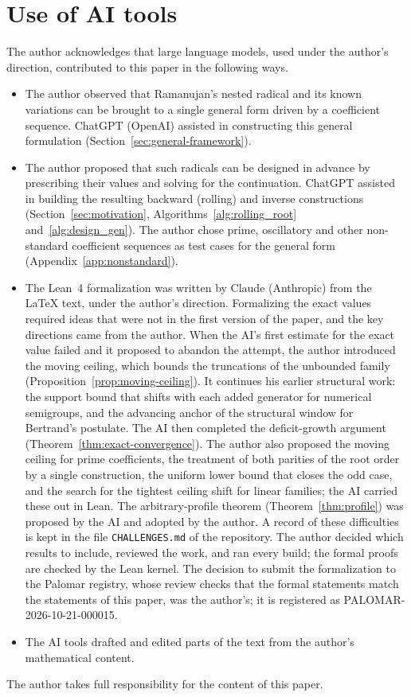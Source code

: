 \documentclass[11pt,a4paper]{amsart}
\theoremstyle{plain}
\theoremstyle{definition}
\theoremstyle{remark}
\begin{document}
\section*{Use of AI tools}
The author acknowledges that large language models, used under the author's
direction, contributed to this paper in the following ways.
\begin{itemize}
\item The author observed that Ramanujan's nested radical and its known variations
  can be brought to a single general form driven by a coefficient sequence. ChatGPT
  (OpenAI) assisted in constructing this general formulation
  (Section~\ref{sec:general-framework}).
\item The author proposed that such radicals can be designed in advance by
  prescribing their values and solving for the continuation. ChatGPT assisted in
  building the resulting backward (rolling) and inverse constructions
  (Section~\ref{sec:motivation}, Algorithms~\ref{alg:rolling_root}
  and~\ref{alg:design_gen}). The author chose prime, oscillatory and other
  non-standard coefficient sequences as test cases for the general form
  (Appendix~\ref{app:nonstandard}).
\item The Lean~4 formalization was written by Claude (Anthropic) from the
  \LaTeX{} text, under the author's direction. Formalizing the exact values
  required ideas that were not in the first version of the paper, and the key
  directions came from the author. When the AI's first estimate for the exact
  value failed and it proposed to abandon the attempt, the author introduced the
  moving ceiling, which bounds the truncations of the unbounded family
  (Proposition~\ref{prop:moving-ceiling}). It continues his earlier structural
  work: the support bound that shifts with each added generator for numerical
  semigroups, and the advancing anchor of the structural window for Bertrand's
  postulate. The AI then completed the deficit-growth argument
  (Theorem~\ref{thm:exact-convergence}). The author also proposed the moving
  ceiling for prime coefficients, the treatment of both parities of the root
  order by a single construction, the uniform lower bound that closes the odd
  case, and the search for the tightest ceiling shift for linear families; the AI
  carried these out in Lean. The arbitrary-profile theorem
  (Theorem~\ref{thm:profile}) was proposed by the AI and adopted by the author.
  A record of these difficulties is kept in the file \texttt{CHALLENGES.md} of
  the repository. The author decided which results to include, reviewed the
  work, and ran every build; the formal proofs are checked by the Lean kernel.
  The decision to submit the formalization to the Palomar registry, whose review
  checks that the formal statements match the statements of this paper, was the
  author's; it is registered as PALOMAR-2026-10-21-000015.
\item The AI tools drafted and edited parts of the text from the author's
  mathematical content.
\end{itemize}
The author takes full responsibility for the content of this paper.

\newpage
\printbibliography
\end{document}
